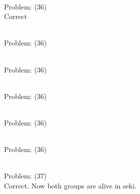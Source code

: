 \documentclass[11pt]{article}
\begin{document}
\begin{minipage}[t]{0.5\textwidth}
  {\centering
  
\\
Problem: (36)\\
Correct\\
  }
\end{minipage}
\begin{minipage}[t]{0.5\textwidth}
  {\centering
  
\\
Problem: (36)\\
  }
\end{minipage}
\begin{minipage}[t]{0.5\textwidth}
  {\centering
  
\\
Problem: (36)\\
  }
\end{minipage}
\begin{minipage}[t]{0.5\textwidth}
  {\centering
  
\\
Problem: (36)\\
  }
\end{minipage}
\begin{minipage}[t]{0.5\textwidth}
  {\centering
  
\\
Problem: (36)\\
  }
\end{minipage}
\begin{minipage}[t]{0.5\textwidth}
  {\centering
  
\\
Problem: (36)\\
  }
\end{minipage}
\begin{minipage}[t]{0.5\textwidth}
  {\centering
  
\\
Problem: (37)\\
Correct. Now both groups are alive in seki.\\
  }
\end{minipage}
\end{document}
